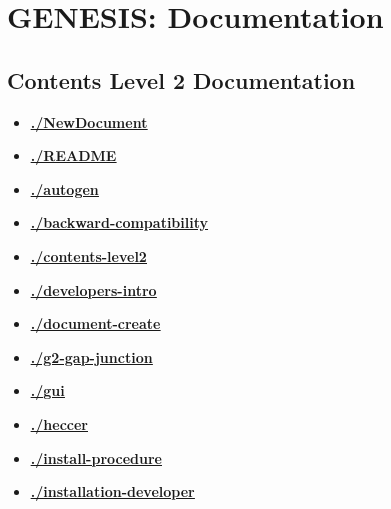 \documentclass[12pt]{article}
\begin{document}
\section*{GENESIS: Documentation}

\subsection*{Contents Level 2 Documentation}

\begin{itemize}

\item \href{.././NewDocument/./NewDocument.pdf}{\bf \underline{./NewDocument}}

\item \href{.././README/./README.pdf}{\bf \underline{./README}}

\item \href{.././autogen/./autogen.pdf}{\bf \underline{./autogen}}

\item \href{.././backward-compatibility/./backward-compatibility.pdf}{\bf \underline{./backward-compatibility}}

\item \href{.././contents-level2/./contents-level2.pdf}{\bf \underline{./contents-level2}}

\item \href{.././developers-intro/./developers-intro.pdf}{\bf \underline{./developers-intro}}

\item \href{.././document-create/./document-create.pdf}{\bf \underline{./document-create}}

\item \href{.././g2-gap-junction/./g2-gap-junction.pdf}{\bf \underline{./g2-gap-junction}}

\item \href{.././gui/./gui.pdf}{\bf \underline{./gui}}

\item \href{.././heccer/./heccer.pdf}{\bf \underline{./heccer}}

\item \href{.././install-procedure/./install-procedure.pdf}{\bf \underline{./install-procedure}}

\item \href{.././installation-developer/./installation-developer.pdf}{\bf \underline{./installation-developer}}


\end{itemize}
\end{document}
